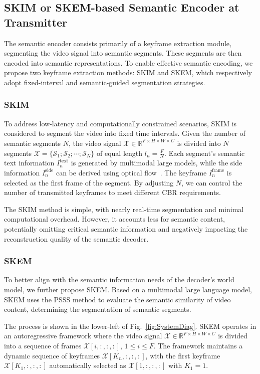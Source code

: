 \documentclass[10pt,journal]{IEEEtran}
\begin{document}
\subsection{SKIM or SKEM-based Semantic Encoder at Transmitter}
\label{subsec:skim}
The semantic encoder consists primarily of a keyframe extraction module, segmenting the video signal into semantic segments. These segments are then encoded into semantic representations. To enable effective semantic encoding, we propose two keyframe extraction methods: SKIM and SKEM, which respectively adopt fixed-interval and semantic-guided segmentation strategies.

\subsubsection{SKIM}

To address low-latency and computationally constrained scenarios, SKIM is considered to segment the video into fixed time intervals. Given the number of semantic segments $N$, the video signal $\mathcal{X} \in \mathbb{R}^{F \times H \times W \times C}$ is divided into $N$ segments $\mathcal{X} = \{\mathcal{S}_1; \mathcal{S}_2; \cdots; \mathcal{S}_N\}$ of equal length $l_n = \frac{F}{N}$. 
Each segment's semantic text information $I^{\text{text}}_n$ is generated by multimodal large models, while the side information $I^{\text{side}}_n$ can be derived using optical flow~\cite{opticalflow}. The keyframe $I^{\text{frame}}_n$ is selected as the first frame of the segment. By adjusting $N$, we can control the number of transmitted keyframes to meet different CBR requirements.

The SKIM method is simple, with nearly real-time segmentation and minimal computational overhead. However, it accounts less for semantic content, potentially omitting critical semantic information and negatively impacting the reconstruction quality of the semantic decoder.
\subsubsection{SKEM}

To better align with the semantic information needs of the decoder's world model, we further propose SKEM. Based on a multimodal large language model, SKEM uses the PSSS method to evaluate the semantic similarity of video content, determining the segmentation of semantic segments.

The process is shown in the lower-left of Fig.~\ref{fig:SystemDiag}. SKEM operates in an autoregressive framework where the video signal $\mathcal{X} \in \mathbb{R}^{F \times H \times W \times C}$ is divided into a sequence of frames $\mathcal{X}[i,:,:,:]$, $1 \leq i \leq F$. The framework maintains a dynamic sequence of keyframes $\mathcal{X}[K_n,:,:,:]$, with the first keyframe $\mathcal{X}[K_1,:,:,:]$ automatically selected as $\mathcal{X}[1,:,:,:]$ with $K_1=1$. 
\end{document}
